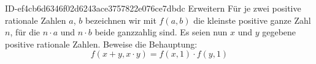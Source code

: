 \begin{exercise}
      {ID-ef4cb6d6346f02d6243ace3757822e076ce7dbdc}
      {Erweitern}
  \ifproblem\problem
    Für je zwei positive rationale Zahlen $a$, $b$ bezeichnen wir mit $f(a,b)$
    die kleinste positive ganze Zahl $n$, für die $n\cdot a$ und $n\cdot b$
    beide ganzzahlig sind. Es seien nun $x$ und $y$ gegebene positive rationale
    Zahlen. Beweise die Behauptung:
    \begin{equation*}
      f(x+y,x\cdot y)=f(x,1)\cdot f(y,1)
    \end{equation*}
  \fi
\end{exercise}
